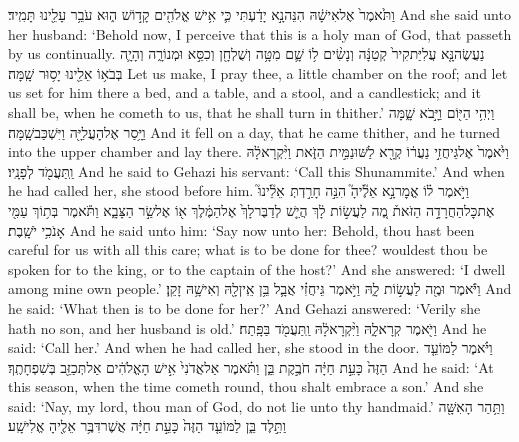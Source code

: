{וַתֹּ֙אמֶר֙ אֶל\maqqaf אִישָׁ֔הּ הִנֵּה\maqqaf נָ֣א יָדַ֔עְתִּי כִּ֛י אִ֥ישׁ אֱלֹהִ֖ים קָד֣וֹשׁ ה֑וּא עֹבֵ֥ר עָלֵ֖ינוּ תָּמִֽיד׃}
{And she said unto her husband: ‘Behold now, I perceive that this is a holy man of God, that passeth by us continually.}
{נַעֲשֶׂה\maqqaf נָּ֤א עֲלִיַּת\maqqaf קִיר֙ קְטַנָּ֔ה וְנָשִׂ֨ים ל֥וֹ שָׁ֛ם מִטָּ֥ה וְשֻׁלְחָ֖ן וְכִסֵּ֣א וּמְנוֹרָ֑ה וְהָיָ֛ה בְּבֹא֥וֹ אֵלֵ֖ינוּ יָס֥וּר שָֽׁמָּה׃}
{Let us make, I pray thee, a little chamber on the roof; and let us set for him there a bed, and a table, and a stool, and a candlestick; and it shall be, when he cometh to us, that he shall turn in thither.’}
{וַיְהִ֥י הַיּ֖וֹם וַיָּ֣בֹא שָׁ֑מָּה וַיָּ֥סַר אֶל\maqqaf הָעֲלִיָּ֖ה וַיִּשְׁכַּב\maqqaf שָֽׁמָּה׃}
{And it fell on a day, that he came thither, and he turned into the upper chamber and lay there.}
{וַיֹּ֙אמֶר֙ אֶל\maqqaf גֵּיחֲזִ֣י נַעֲר֔וֹ קְרָ֖א לַשּׁוּנַמִּ֣ית הַזֹּ֑את וַיִּ֨קְרָא\maqqaf לָ֔הּ וַֽתַּעֲמֹ֖ד לְפָנָֽיו׃}
{And he said to Gehazi his servant: ‘Call this Shunammite.’ And when he had called her, she stood before him.}
{וַיֹּ֣אמֶר ל֗וֹ אֱמׇר\maqqaf נָ֣א אֵלֶ֘יהָ֮ הִנֵּ֣ה חָרַ֣דְתְּ \pasek  אֵלֵ֘ינוּ֮ אֶת\maqqaf כׇּל\maqqaf הַחֲרָדָ֣ה הַזֹּאת֒ מֶ֚ה לַעֲשׂ֣וֹת לָ֔ךְ הֲיֵ֤שׁ לְדַבֶּר\maqqaf לָךְ֙ אֶל\maqqaf הַמֶּ֔לֶךְ א֖וֹ אֶל\maqqaf שַׂ֣ר הַצָּבָ֑א וַתֹּ֕אמֶר בְּת֥וֹךְ עַמִּ֖י אָנֹכִ֥י יֹשָֽׁבֶת׃}
{And he said unto him: ‘Say now unto her: Behold, thou hast been careful for us with all this care; what is to be done for thee? wouldest thou be spoken for to the king, or to the captain of the host?’ And she answered: ‘I dwell among mine own people.’}
{וַיֹּ֕אמֶר וּמֶ֖ה לַעֲשׂ֣וֹת לָ֑הּ וַיֹּ֣אמֶר גֵּיחֲזִ֗י אֲבָ֛ל בֵּ֥ן אֵֽין\maqqaf לָ֖הּ וְאִישָׁ֥הּ זָקֵֽן׃}
{And he said: ‘What then is to be done for her?’ And Gehazi answered: ‘Verily she hath no son, and her husband is old.’}
{וַיֹּ֖אמֶר קְרָא\maqqaf לָ֑הּ וַיִּ֨קְרָא\maqqaf לָ֔הּ וַֽתַּעֲמֹ֖ד בַּפָּֽתַח׃}
{And he said: ‘Call her.’ And when he had called her, she stood in the door.}
{וַיֹּ֗אמֶר לַמּוֹעֵ֤ד הַזֶּה֙ כָּעֵ֣ת חַיָּ֔ה  חֹבֶ֣קֶת בֵּ֑ן וַתֹּ֗אמֶר אַל\maqqaf אֲדֹנִי֙ אִ֣ישׁ הָאֱלֹהִ֔ים אַל\maqqaf תְּכַזֵּ֖ב בְּשִׁפְחָתֶֽךָ׃}
{And he said: ‘At this season, when the time cometh round, thou shalt embrace a son.’ And she said: ‘Nay, my lord, thou man of God, do not lie unto thy handmaid.’}
{וַתַּ֥הַר הָאִשָּׁ֖ה וַתֵּ֣לֶד בֵּ֑ן לַמּוֹעֵ֤ד הַזֶּה֙ כָּעֵ֣ת חַיָּ֔ה אֲשֶׁר\maqqaf דִּבֶּ֥ר אֵלֶ֖יהָ אֱלִישָֽׁע׃}
